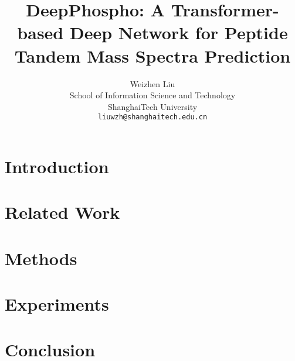 \documentclass[final]{cvpr}
\begin{document}
\title{DeepPhospho: A Transformer-based Deep Network for Peptide \\Tandem Mass Spectra Prediction}

\author{Weizhen Liu\\
School of Information Science and Technology\\
ShanghaiTech University\\
{\tt\small liuwzh@shanghaitech.edu.cn}}


\maketitle





\section{Introduction}


\section{Related Work}


\section{Methods}


\section{Experiments}


\section{Conclusion}



%
%
\end{document}
